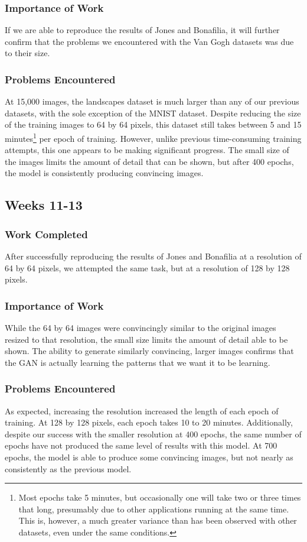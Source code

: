 \documentclass[11pt,letterpaper]{article}
\begin{document}
			\subsubsection{Importance of Work}
				If we are able to reproduce the results of Jones and Bonafilia, it will further confirm that the problems we encountered with the Van Gogh datasets was due to their size.
			\subsubsection{Problems Encountered}
				At 15,000 images, the landscapes dataset is much larger than any of our previous datasets, with the sole exception of the MNIST dataset.
				Despite reducing the size of the training images to 64 by 64 pixels, this dataset still takes between 5 and 15 minutes\footnote{Most epochs take 5 minutes, but occasionally one will take two or three times that long, presumably due to other applications running at the same time. This is, however, a much greater variance than has been observed with other datasets, even under the same conditions.} per epoch of training.
				However, unlike previous time-consuming training attempts, this one appears to be making significant progress.
				The small size of the images limits the amount of detail that can be shown, but after 400 epochs, the model is consistently producing convincing images.

		\subsection{Weeks 11-13}
			\subsubsection{Work Completed}
				After successfully reproducing the results of Jones and Bonafilia at a resolution of 64 by 64 pixels, we attempted the same task, but at a resolution of 128 by 128 pixels.

			\subsubsection{Importance of Work}
				While the 64 by 64 images were convincingly similar to the original images resized to that resolution, the small size limits the amount of detail able to be shown.
				The ability to generate similarly convincing, larger images confirms that the GAN is actually learning the patterns that we want it to be learning.

			\subsubsection{Problems Encountered}
				As expected, increasing the resolution increased the length of each epoch of training.
				At 128 by 128 pixels, each epoch takes 10 to 20 minutes.
				Additionally, despite our success with the smaller resolution at 400 epochs, the same number of epochs have not produced the same level of results with this model.
				At 700 epochs, the model is able to produce some convincing images, but not nearly as consistently as the previous model.




\nocite{*}
\end{document}
